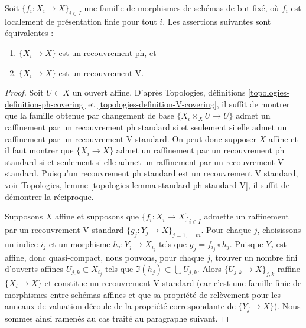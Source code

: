 \begin{lemma}
\label{lemma-equivalence-h-v-locally-finite-presentation}
Soit $\{f_i : X_i \to X\}_{i \in I}$ une famille de morphismes
de schémas de but fixé, où $f_i$ est localement de
présentation finie pour tout $i$. Les assertions suivantes sont équivalentes :
\begin{enumerate}
\item $\{X_i \to X\}$ est un recouvrement ph, et
\item $\{X_i \to X\}$ est un recouvrement V.
\end{enumerate}
\end{lemma}

\begin{proof}
Soit $U \subset X$ un ouvert affine. D'après
Topologies, définitions \ref{topologies-definition-ph-covering}
et \ref{topologies-definition-V-covering}, il suffit de montrer que
la famille obtenue par changement de base $\{X_i \times_X U \to U\}$ admet un raffinement
par un recouvrement ph standard si et seulement si elle admet un raffinement par
un recouvrement V standard. On peut donc supposer $X$ affine et il faut montrer que
$\{X_i \to X\}$ admet un raffinement par un recouvrement ph standard
si et seulement si elle admet un raffinement par un recouvrement V standard.
Puisqu'un recouvrement ph standard est un recouvrement V standard, voir
Topologies, lemme \ref{topologies-lemma-standard-ph-standard-V},
il suffit de démontrer la réciproque.

\medskip\noindent
Supposons $X$ affine et supposons que $\{f_i : X_i \to X\}_{i \in I}$
admette un raffinement par un recouvrement V standard
$\{g_j : Y_j \to X\}_{j = 1, \ldots, m}$.
Pour chaque $j$, choisissons un indice $i_j$ et un morphisme
$h_j : Y_j \to X_{i_j}$ tels que $g_j = f_{i_j} \circ h_j$.
Puisque $Y_j$ est affine, donc quasi-compact,
nous pouvons, pour chaque $j$, trouver un nombre fini d'ouverts affines
$U_{j, k} \subset X_{i_j}$ tels que $\Im(h_j) \subset \bigcup U_{j, k}$.
Alors $\{U_{j, k} \to X\}_{j, k}$ raffine $\{X_i \to X\}$
et constitue un recouvrement V standard (car c'est une famille finie de morphismes
entre schémas affines et que sa propriété de relèvement pour les anneaux de valuation
découle de la propriété correspondante de $\{Y_j \to X\}$).
Nous sommes ainsi ramenés au cas traité au paragraphe suivant.


\end{proof}
